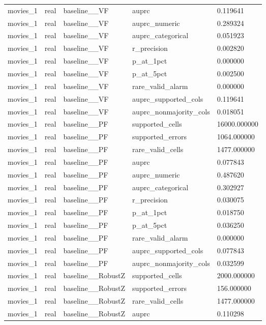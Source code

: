 \begin{tabular}{lllll}
movies\_1 & real & baseline\_\_VF & auprc & 0.119641 \\
movies\_1 & real & baseline\_\_VF & auprc\_numeric & 0.289324 \\
movies\_1 & real & baseline\_\_VF & auprc\_categorical & 0.051923 \\
movies\_1 & real & baseline\_\_VF & r\_precision & 0.002820 \\
movies\_1 & real & baseline\_\_VF & p\_at\_1pct & 0.000000 \\
movies\_1 & real & baseline\_\_VF & p\_at\_5pct & 0.002500 \\
movies\_1 & real & baseline\_\_VF & rare\_valid\_alarm & 0.000000 \\
movies\_1 & real & baseline\_\_VF & auprc\_supported\_cols & 0.119641 \\
movies\_1 & real & baseline\_\_VF & auprc\_nonmajority\_cols & 0.018051 \\
movies\_1 & real & baseline\_\_PF & supported\_cells & 16000.000000 \\
movies\_1 & real & baseline\_\_PF & supported\_errors & 1064.000000 \\
movies\_1 & real & baseline\_\_PF & rare\_valid\_cells & 1477.000000 \\
movies\_1 & real & baseline\_\_PF & auprc & 0.077843 \\
movies\_1 & real & baseline\_\_PF & auprc\_numeric & 0.487620 \\
movies\_1 & real & baseline\_\_PF & auprc\_categorical & 0.302927 \\
movies\_1 & real & baseline\_\_PF & r\_precision & 0.030075 \\
movies\_1 & real & baseline\_\_PF & p\_at\_1pct & 0.018750 \\
movies\_1 & real & baseline\_\_PF & p\_at\_5pct & 0.036250 \\
movies\_1 & real & baseline\_\_PF & rare\_valid\_alarm & 0.000000 \\
movies\_1 & real & baseline\_\_PF & auprc\_supported\_cols & 0.077843 \\
movies\_1 & real & baseline\_\_PF & auprc\_nonmajority\_cols & 0.032599 \\
movies\_1 & real & baseline\_\_RobustZ & supported\_cells & 2000.000000 \\
movies\_1 & real & baseline\_\_RobustZ & supported\_errors & 156.000000 \\
movies\_1 & real & baseline\_\_RobustZ & rare\_valid\_cells & 1477.000000 \\
movies\_1 & real & baseline\_\_RobustZ & auprc & 0.110298 \\

\end{tabular}
